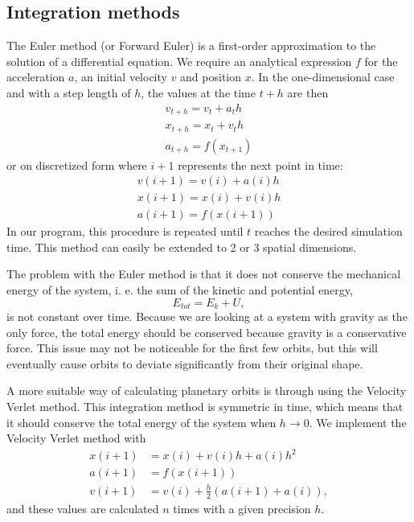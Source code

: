 \documentclass{emulateapj}
\begin{document}
\subsection{Integration methods}
The Euler method (or Forward Euler) is a first-order approximation to the solution of a differential equation. We require an analytical expression $f$ for the acceleration $a$, an initial velocity $v$ and position $x$. In the one-dimensional case and with a step length of $h$, the values at the time $t + h$ are then
%
\begin{gather*}
    v_{t + h} = v_{t} + a_{t} h \\
    x_{t + h} = x_{t} + v_{t} h \\
    a_{t + h} = f(x_{t+1}) 
\end{gather*}
%
or on discretized form where $i+1$ represents the next point in time:
%
\begin{gather*}
    v(i + 1) = v(i) + a(i) h \\
    x(i + 1) = x(i) + v(i) h \\
    a(i + 1) = f(x(i+1))
\end{gather*}
%
In our program, this procedure is repeated until $t$ reaches the desired simulation time. This method can easily be extended to 2 or 3 spatial dimensions.

The problem with the Euler method is that it does not conserve the mechanical energy of the system, i. e. the sum of the kinetic and potential energy,
%
\begin{equation}
E_{tot} = E_k + U,
\end{equation}
%
is not constant over time. Because we are looking at a system with gravity as the only force, the total energy should be conserved because gravity is a conservative force. This issue may not be noticeable for the first few orbits, but this will eventually cause orbits to deviate significantly from their original shape.

A more suitable way of calculating planetary orbits is through using the Velocity Verlet method. This integration method is symmetric in time, which means that it should conserve the total energy of the system when $h \rightarrow 0$. We implement the Velocity Verlet method with
%
\begin{align*}
    x(i + 1) & = x(i) + v(i) h + a(i) h^2 \\
    a(i + 1) & = f(x(i+1)) \\
    v(i + 1) & = v(i) + \frac{h}{2}\left(a(i+1) + a(i)\right),
\end{align*}
%
and these values are calculated $n$ times with a given precision $h$.
\end{document}
